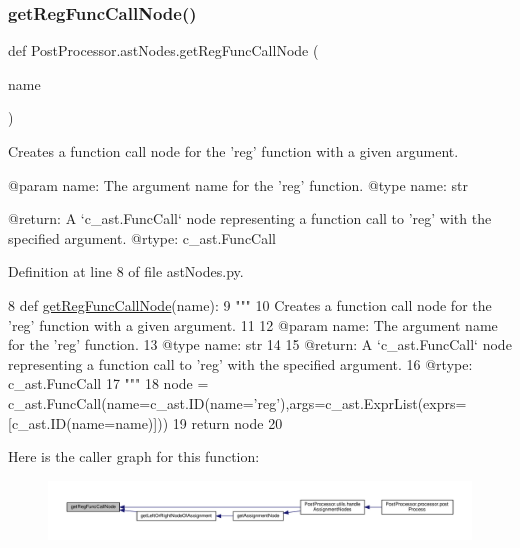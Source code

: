 \subsubsection{\texorpdfstring{get\+Reg\+Func\+Call\+Node()}{getRegFuncCallNode()}}
{\footnotesize\ttfamily def Post\+Processor.\+ast\+Nodes.\+get\+Reg\+Func\+Call\+Node (\begin{DoxyParamCaption}\item[{}]{name }\end{DoxyParamCaption})}

\begin{DoxyVerb}Creates a function call node for the 'reg' function with a given argument.

@param name: The argument name for the 'reg' function.
@type name: str

@return: A `c_ast.FuncCall` node representing a function call to 'reg' with the specified argument.
@rtype: c_ast.FuncCall
\end{DoxyVerb}
 

Definition at line 8 of file ast\+Nodes.\+py.


\begin{DoxyCode}
8 \textcolor{keyword}{def }\hyperlink{namespacePostProcessor_1_1astNodes_a30de65f8e1753733f88a01d42927ef1b}{getRegFuncCallNode}(name):
9     \textcolor{stringliteral}{"""
}
10 \textcolor{stringliteral}{    Creates a function call node for the 'reg' function with a given argument.
}
11 \textcolor{stringliteral}{
}
12 \textcolor{stringliteral}{    @param name: The argument name for the 'reg' function.
}
13 \textcolor{stringliteral}{    @type name: str
}
14 \textcolor{stringliteral}{
}
15 \textcolor{stringliteral}{    @return: A `c\_ast.FuncCall` node representing a function call to 'reg' with the specified argument.
}
16 \textcolor{stringliteral}{    @rtype: c\_ast.FuncCall
}
17 \textcolor{stringliteral}{    """}
18     node = c\_ast.FuncCall(name=c\_ast.ID(name=\textcolor{stringliteral}{'reg'}),args=c\_ast.ExprList(exprs=[c\_ast.ID(name=name)]))
19     \textcolor{keywordflow}{return} node
20 
\end{DoxyCode}
Here is the caller graph for this function\+:\nopagebreak
\begin{figure}[H]
\begin{center}
\leavevmode
\includegraphics[width=350pt]{namespacePostProcessor_1_1astNodes_a30de65f8e1753733f88a01d42927ef1b_icgraph}
\end{center}
\end{figure}
\mbox{\label{namespacePostProcessor_1_1astNodes_a1fc39a0ad420aefababe0a8ee2907f4e}} 

